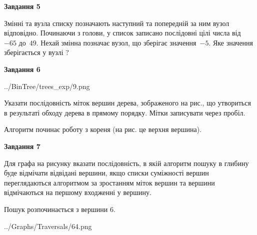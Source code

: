 \documentclass[12pt, ukrainian]{article}
\begin{document}
{\begin {large}
{\begin {center}\textbf{Завдання 5}\end {center}}\par
Змінні  та  вузла списку позначають наступний та попередній за ним вузол відповідно. Починаючи з голови, у список записано послідовні цілі числа від~$-65$ до~$49$. Нехай змінна  позначає вузол, що зберігає значення~$-5$.
Яке значення зберігається у вузлі  ?\par
\newpage

{\begin {center}\textbf{Завдання 6}\end {center}}\par

\begin{center}
	{../BinTree/trees_exp/9.png}
\end{center}
Указати послідовність міток вершин дерева, зображеного на рис., що утвориться в результаті обходу дерева в прямому порядку. Мітки записувати через пробіл.\par Алгоритм починає роботу з кореня (на рис. це верхня вершина).\par
\newpage

{\begin {center}\textbf{Завдання 7}\end {center}}\par
Для графа на рисунку вказати послідовність, в якій алгоритм пошуку в глибину буде відмічати відвідані вершини, якщо списки суміжності вершин переглядаються алгоритмом за зростанням міток вершин та вершини відмічаються на першому вход\-женні у вершину.\par
Пошук розпочинається з вершини 6.\par

\begin{center}
	{../Graphs/Traversals/64.png}
\end{center}\par
\newpage


\end{large}}
\end{document}
